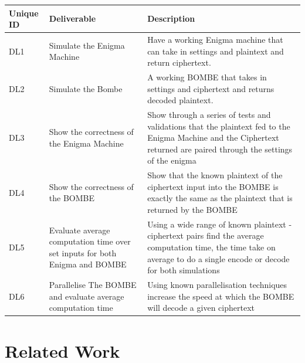 \documentclass[12pt,a4paper]{article}
\begin{document}
\label{units}
\begin{longtable}{ |p{1.25cm}|p{4cm}|p{7cm}| }\hline\hline
Unique ID & Deliverable & Description \\ \hline
DL1 & Simulate the Enigma Machine & Have a working Enigma machine that can take in settings and plaintext and return ciphertext. \\ \hline
DL2 & Simulate the Bombe & A working BOMBE that takes in settings and ciphertext and returns decoded plaintext. \\ \hline
DL3 & Show the correctness of the Enigma Machine & Show through a series of tests and validations that the plaintext fed to the Enigma Machine and the Ciphertext returned are paired through the settings of the enigma \\ \hline
DL4 & Show the correctness of the BOMBE & Show that the known plaintext of the ciphertext input into the BOMBE is exactly the same as the plaintext that is returned by the BOMBE \\ \hline
DL5 & Evaluate average computation time over set inputs for both Enigma and BOMBE & Using a wide range of known plaintext - ciphertext pairs find the average computation time, the time take on average to do a single encode or decode for both simulations \\ \hline
DL6 & Parallelise The BOMBE and evaluate average computation time & Using known parallelisation techniques increase the speed at which the BOMBE will decode a given ciphertext \\ \hline
\end{longtable}

\section{Related Work}

\end{document}
